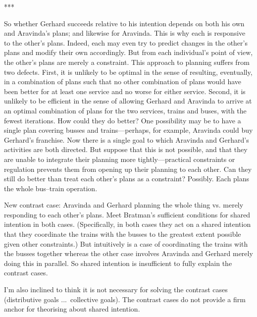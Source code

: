 \documentclass[12pt,\papersize]{extarticle}
\begin{document}
***

So whether Gerhard succeeds relative to his intention depends on both his own and Aravinda's plans; and likewise for Aravinda.
This is why each is responsive to the other's plans. 
Indeed, each may even try to predict changes in the other's plans and modify their own accordingly.  
But from each individual's point of view, the other's plans are  merely a constraint.
This approach to planning suffers from two defects.
First, it is unlikely to be optimal in the sense of resulting, eventually, in a combination of plans such that no other combination of plans would have been better for at least one service and no worse for either service.
Second, it is unlikely to be efficient in the sense of allowing Gerhard and Aravinda to arrive at an optimal combination of plans for the two services, trains and buses, with the fewest iterations.
How could they do better?
One possibility may be to have a single plan covering busses and trains---perhaps, for example, Aravinda could buy Gerhard's franchise. 
Now there is a single goal to which Aravinda and Gerhard's activities are both directed.
But suppose that this is not possible, and that they are unable to integrate their planning more tightly---practical constraints or regulation prevents them from opening up their planning to each other.
Can they still do better than treat each other's plans as a constraint?
Possibly.
Each plans the whole bus--train operation. 

New contrast case: Aravinda and Gerhard planning the whole thing vs. merely responding to each other's plans.
Meet Bratman's sufficient conditions for shared intention in both cases.
(Specifically, in both cases they act on a shared intention that they coordinate the trains with the busses to the greatest extent possible given other constraints.)
But intuitively is a case of coordinating the trains with the busses together whereas the other case involves Aravinda and Gerhard merely doing this in parallel.
So shared intention is insufficient to fully explain the contrast cases.

I'm also inclined to think it is not necessary for solving the contrast cases (distributive goals ...\ collective goals).
The contrast cases do not provide a firm anchor for theorising about shared intention.




\end{document}
